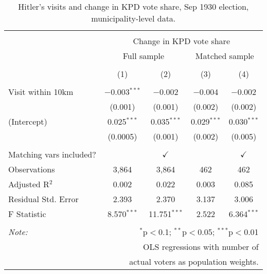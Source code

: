
\begin{table}[!htbp] \centering 
  \caption{Hitler's visits and change in KPD vote share, Sep 1930 election, municipality-level data.} 
  \label{tab:ols--5} 
\begin{tabular}{@{\extracolsep{5pt}}lcccc} 
\\[-1.8ex]\hline 
\hline \\[-1.8ex] 
 & \multicolumn{4}{c}{Change in KPD vote share} \\ 
\cline{2-5} 
 & \multicolumn{2}{c}{Full sample} & \multicolumn{2}{c}{Matched sample} \\ 
\\[-1.8ex] & (1) & (2) & (3) & (4)\\ 
\hline \\[-1.8ex] 
 Visit within 10km & $-$0.003$^{***}$ & $-$0.002 & $-$0.004 & $-$0.002 \\ 
  & (0.001) & (0.001) & (0.002) & (0.002) \\ 
  (Intercept) & 0.025$^{***}$ & 0.035$^{***}$ & 0.029$^{***}$ & 0.030$^{***}$ \\ 
  & (0.0005) & (0.001) & (0.002) & (0.005) \\ 
 \hline \\[-1.8ex] 
Matching vars included? &  & \multicolumn{1}{c}{$\checkmark$} &  & \multicolumn{1}{c}{$\checkmark$} \\ 
Observations & 3,864 & 3,864 & 462 & 462 \\ 
Adjusted R$^{2}$ & 0.002 & 0.022 & 0.003 & 0.085 \\ 
Residual Std. Error & 2.393 & 2.370 & 3.137 & 3.006 \\ 
F Statistic & 8.570$^{***}$ & 11.751$^{***}$ & 2.522 & 6.364$^{***}$ \\ 
\hline 
\hline \\[-1.8ex] 
\textit{Note:}  & \multicolumn{4}{r}{$^{*}$p$<$0.1; $^{**}$p$<$0.05; $^{***}$p$<$0.01} \\ 
 & \multicolumn{4}{r}{OLS regressions with number of} \\ 
 & \multicolumn{4}{r}{actual voters as population weights.} \\ 
\end{tabular} 
\end{table} 
